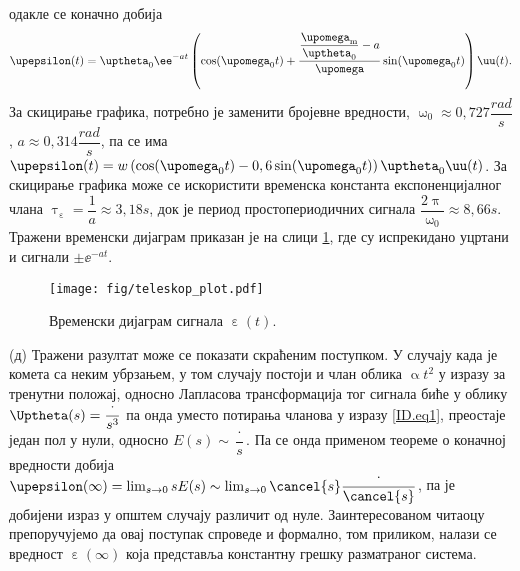 одакле се коначно добија 
\begin{equation}
    \upepsilon(t) = 
    \uptheta_0 
    \ee^{-at}
    \left(
        \cos(\upomega_0 t)
        + 
        \dfrac{ \dfrac{\upomega_{\rm m}}{\uptheta_0} - a  }{\upomega}
        \sin(\upomega_0 t)
    \right) \uu(t).
\end{equation}
За скицирање графика, потребно је заменити бројевне вредности, 
$\upomega_0 \approx 0,727 \unit{\dfrac{rad}{s}}$, 
$a \approx 0,314 \unit{\dfrac{rad}{s}}$, па се има 
$\upepsilon(t) = w
\left(
    \cos(\upomega_0 t) 
    -
    0,6\sin(\upomega_0 t)
\right) 
\uptheta_0 
\uu(t)$. За скицирање графика може се искористити временска константа експоненцијалног члана 
$\uptau_{\upepsilon} = \dfrac{1}{a} \approx 3,18\unit{s}$, док је период простопериодичних сигнала 
$\dfrac{2\uppi}{\upomega_0} \approx 8,66\unit{s}$. Тражени временски дијаграм приказан је на слици
\ref{fig:\ID.res}, где су испрекидано уцртани и сигнали $\pm \ee^{-at}$.
\begin{figure}[ht!]
    \centering
    \texttt{[image: fig/teleskop\_plot.pdf]}
    \caption{Временски дијаграм сигнала $\upepsilon(t)$.}
    \label{fig:\ID.res}
\end{figure}

(д) Тражени разултат може се показати скраћеним поступком. У случају када је комета са неким убрзањем, у том случају постоји и члан облика 
$\upalpha t^2$ у изразу за тренутни положај, односно Лапласова трансформација тог сигнала 
биће у облику $\Uptheta(s) = \dfrac{\cdot}{s^3}$ па онда уместо потирања чланова 
у изразу \ref{ID.eq1}, преостаје један пол у нули, односно $E(s) \sim \dfrac{\cdot}{s}$.
Па се онда применом теореме о коначној вредности добија 
$\upepsilon(\infty) = \lim_{s \to 0} s E(s) \sim \lim_{s \to 0} \cancel{s} \dfrac{\cdot}{\cancel{s}}$, па је 
добијени израз у општем случају различит од нуле. Заинтересованом читаоцу препоручујемо да овај поступак спроведе и 
формално, том приликом, налази се вредност $\upepsilon(\infty)$ која представља константну грешку разматраног система. 
